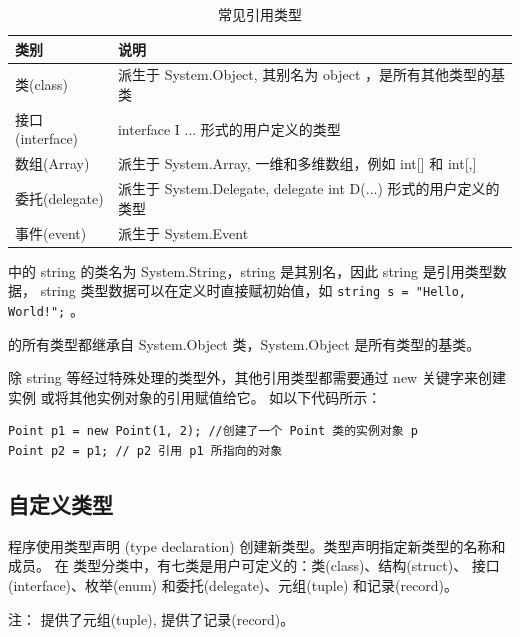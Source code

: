 \begin{table}[htbp]
    \centering
    \caption{常见引用类型}
    \label{tab:referencetype}
    \begin{tabular}{l l}
        \hline
        类别            & 说明                                                  \\
        \hline
        类(class)      & 派生于 System.Object, 其别名为 object ，是所有其他类型的基类          \\
        接口(interface) & interface I {...} 形式的用户定义的类型                        \\
        数组(Array)     & 派生于 System.Array, 一维和多维数组，例如 int[] 和 int[,]         \\
        委托(delegate)  & 派生于 System.Delegate, delegate int D(...) 形式的用户定义的类型 \\
        事件(event)     & 派生于 System.Event                                    \\
        \hline
    \end{tabular}
\end{table}

\cs 中的 string 的类名为 System.String，string 是其别名，因此 string 是引用类型数据，
string 类型数据可以在定义时直接赋初始值，如 \verb|string s = "Hello, World!";| 。

\cs 的所有类型都继承自 System.Object 类，System.Object 是所有类型的基类。

除 string 等经过特殊处理的类型外，其他引用类型都需要通过 new 关键字来创建实例
或将其他实例对象的引用赋值给它。
如以下代码所示：

\begin{lstlisting}
Point p1 = new Point(1, 2); //创建了一个 Point 类的实例对象 p
Point p2 = p1; // p2 引用 p1 所指向的对象
\end{lstlisting}


\subsection{自定义类型}
\cs  程序使用类型声明 (type declaration) 创建新类型。类型声明指定新类型的名称和成员。
在  \cs  类型分类中，有七类是用户可定义的：类(class)、结构(struct)、
接口(interface)、枚举(enum) 和委托(delegate)、元组(tuple) 和记录(record)。

注： 提供了元组(tuple),  提供了记录(record)。

